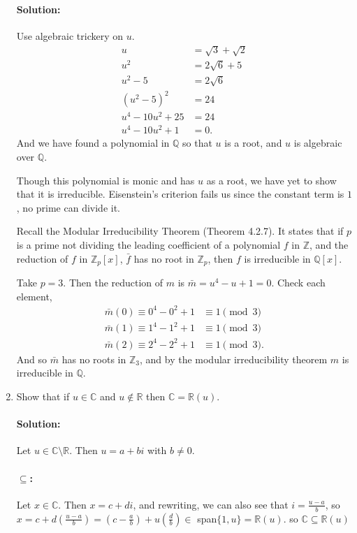 \documentclass{article}
\begin{document}
\begin{enumerate}
\paragraph{Solution: }Use algebraic trickery on $u.$  
\begin{align*}
    u&=  \sqrt{3} +\sqrt{2} \\
    u^2&= 2\sqrt{6} +5 \\
    u^2-5&= 2\sqrt{6}  \\
    (u^2-5)^2&= 24 \\
    u^4-10u^2+25&= 24 \\
    u^{4}-10u^2+1&= 0 
.\end{align*}
And we have found a polynomial in $\mathbb{Q}$ so that $u$ is a root, and $u $ is algebraic over $\mathbb{Q}$.

Though this polynomial is monic and has $u$ as a root, we have yet to show that it is irreducible. Eisenstein's criterion fails us since
the constant term is  $1$, no prime can divide it.

Recall the Modular Irreducibility Theorem (Theorem 4.2.7). It states that if $p$ is a prime not dividing the leading coefficient of a polynomial
$f$ in $\mathbb{Z}$, and the reduction of $f$ in $\mathbb{Z}_p[x]$, $\bar{f}$ has no root in $\mathbb{Z}_p$, then $f$ is irreducible in $\mathbb{Q}[x]$.

Take $p=3$. Then the reduction of  $m$ is $\bar{m}=u^{4}-u+1= 0$. Check each element, 
\begin{align*}
    \bar{m}(0)\equiv 0^4-0^2+1&\equiv 1\pmod{3} \\
    \bar{m}(1)\equiv 1^{4}-1^2+1&\equiv 1\pmod{3} \\
    \bar{m}(2)\equiv 2^{4}-2^2+1&\equiv 1\pmod{3} 
.\end{align*}
And so $\bar{m}$ has no roots in $\mathbb{Z}_3$, and by the modular irreducibility theorem $m$ is irreducible in $\mathbb{Q}$.

\item Show that if $u\in\mathbb{C}$ and $u\notin\mathbb{R}$ then $\mathbb{C}=\mathbb{R}(u).$
    \paragraph{Solution: } Let $u\in \mathbb{C}\setminus\mathbb{R}$. Then $u=a+bi$ with $b\neq 0$.

    \paragraph{$\subseteq $: }Let $x\in \mathbb{C}$. Then $x=c+di$, and rewriting, we can also see that  $i=\frac{u-a}{b}$, so 
    $x=c+d\left( \frac{u-a}{b} \right) =(c-\frac{a}{b})+u\left( \frac{d}{b} \right) \in $ span$ \{1,u\} =\mathbb{R}(u)$. so $\mathbb{C}\subseteq \mathbb{R}(u)$


\end{enumerate}
\end{document}
